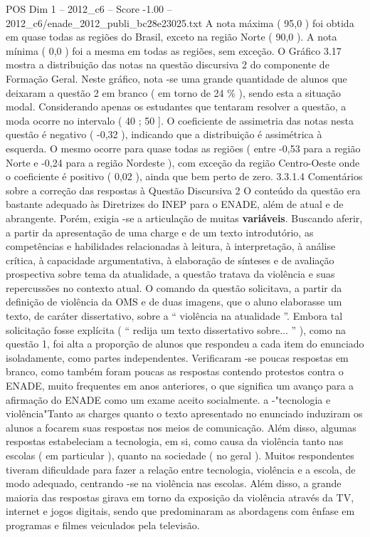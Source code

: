 \begin{textsample}{POS Dim 1 – 2012\_c6 – Score -1.00 – 2012\_c6/enade\_2012\_publi\_bc28e23025.txt}
A nota máxima ( 95,0 ) foi obtida em quase todas as regiões do Brasil, exceto na região Norte ( 90,0 ).
A nota mínima ( 0,0 ) foi a mesma em todas as regiões, sem exceção.
O Gráfico 3.17 mostra a distribuição das notas na questão discursiva 2 do componente de Formação Geral.
Neste gráfico, nota -se uma grande quantidade de alunos que deixaram a questão 2 em branco ( em torno de 24 \% ), sendo esta a situação modal.
Considerando apenas os estudantes que tentaram resolver a questão, a moda ocorre no intervalo ( 40 ; 50 ].
O coeficiente de assimetria das notas nesta questão é negativo ( -0,32 ), indicando que a distribuição é assimétrica à esquerda.
O mesmo ocorre para quase todas as regiões ( entre -0,53 para a região Norte e -0,24 para a região Nordeste ), com exceção da região Centro-Oeste onde o coeficiente é positivo ( 0,02 ), ainda que bem perto de zero. 3.3.1.4 Comentários sobre a correção das respostas à Questão Discursiva 2 O conteúdo da questão era bastante adequado às Diretrizes do INEP para o ENADE, além de atual e de abrangente.
Porém, exigia -se a articulação de muitas \textbf{variáveis}.
Buscando aferir, a partir da apresentação de uma charge e de um texto introdutório, as competências e habilidades relacionadas à leitura, à interpretação, à análise crítica, à capacidade argumentativa, à elaboração de sínteses e de avaliação prospectiva sobre tema da atualidade, a questão tratava da violência e suas repercussões no contexto atual.
O comando da questão solicitava, a partir da definição de violência da OMS e de duas imagens, que o aluno elaborasse um texto, de caráter dissertativo, sobre a “ violência na atualidade ”.
Embora tal solicitação fosse explícita ( “ redija um texto dissertativo sobre... ” ), como na questão 1, foi alta a proporção de alunos que respondeu a cada item do enunciado isoladamente, como partes independentes.
Verificaram -se poucas respostas em branco, como também foram poucas as respostas contendo protestos contra o ENADE, muito frequentes em anos anteriores, o que significa um avanço para a afirmação do ENADE como um exame aceito socialmente. a -"tecnologia e violência"Tanto as charges quanto o texto apresentado no enunciado induziram os alunos a focarem suas respostas nos meios de comunicação.
Além disso, algumas respostas estabeleciam a tecnologia, em si, como causa da violência tanto nas escolas ( em particular ), quanto na sociedade ( no geral ).
Muitos respondentes tiveram dificuldade para fazer a relação entre tecnologia, violência e a escola, de modo adequado, centrando -se na violência nas escolas.
Além disso, a grande maioria das respostas girava em torno da exposição da violência através da TV, internet e jogos digitais, sendo que predominaram as abordagens com ênfase em programas e filmes veiculados pela televisão.

\end{textsample}
